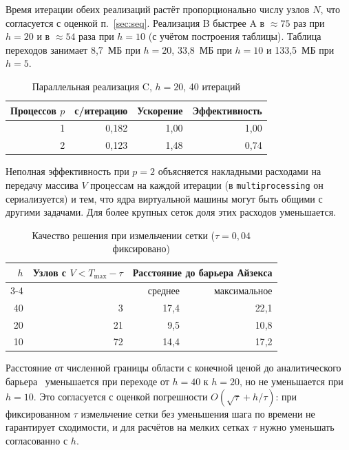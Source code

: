 \documentclass[14pt,a4paper]{extarticle}
\newcommand{\Tmax}{T_{\max}}
\begin{document}
Время итерации обеих реализаций растёт пропорционально числу узлов $N$, что
согласуется с оценкой п.~\ref{sec:seq}. Реализация B быстрее A в
$\approx 75$ раз при $h=20$ и в $\approx 54$ раза при $h=10$ (с учётом
построения таблицы). Таблица переходов занимает 8{,}7~МБ при $h=20$,
33{,}8~МБ при $h=10$ и 133{,}5~МБ при $h=5$.

\begin{table}[H]
	\centering
	\caption{Параллельная реализация C, $h=20$, 40 итераций}
	\label{tab:par}
	\begin{tabular}{@{}rrrr@{}}
		\toprule
		Процессов $p$ & с/итерацию & Ускорение & Эффективность \\
		\midrule
		1 & 0{,}182 & 1{,}00 & 1{,}00 \\
		2 & 0{,}123 & 1{,}48 & 0{,}74 \\
		\bottomrule
	\end{tabular}
\end{table}

Неполная эффективность при $p=2$ объясняется накладными расходами на
передачу массива $V$ процессам на каждой итерации (в \texttt{multiprocessing}
он сериализуется) и тем, что ядра виртуальной машины могут быть общими с
другими задачами. Для более крупных сеток доля этих расходов уменьшается.

\begin{table}[H]
	\centering
	\caption{Качество решения при измельчении сетки ($\tau=0{,}04$ фиксировано)}
	\label{tab:quality}
	\begin{tabular}{@{}rrrr@{}}
		\toprule
		$h$ & Узлов с $V<\Tmax-\tau$ & \multicolumn{2}{c}{Расстояние до барьера Айзекса} \\
		\cmidrule(l){3-4}
		 & & среднее & максимальное \\
		\midrule
		40 & 3  & 17{,}4 & 22{,}1 \\
		20 & 21 & 9{,}5  & 10{,}8 \\
		10 & 72 & 14{,}4 & 17{,}2 \\
		\bottomrule
	\end{tabular}
\end{table}

Расстояние от численной границы области с конечной ценой до
аналитического барьера~\cite{isaacs} уменьшается при переходе от $h=40$
к $h=20$, но не уменьшается при $h=10$. Это согласуется с оценкой
погрешности $O(\sqrt\tau+h/\tau)$: при фиксированном $\tau$ измельчение
сетки без уменьшения шага по времени не гарантирует сходимости, и для
расчётов на мелких сетках $\tau$ нужно уменьшать согласованно с $h$.
\end{document}
